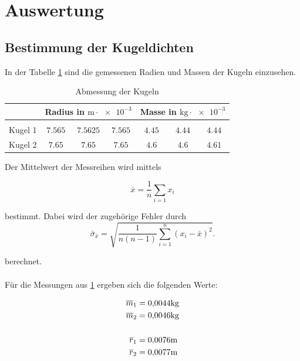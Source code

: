 \section{Auswertung}


\subsection{Bestimmung der Kugeldichten}

In der Tabelle \ref{tab:messwerte_kugel} sind die gemessenen
Radien und Massen der Kugeln einzusehen.

\begin{table}
\centering
\begin{tabular} {ccccccc}
	\toprule
  & \multicolumn{3}{c}{Radius in $\si{\meter}\cdot \num{e-3}$}  & \multicolumn{3}{c}{Masse in $\si{\kilogram}\cdot \num{e-3}$} \\
\midrule \\
Kugel 1 & $\num{7.565} $&  $\num{7.5625} $ & $\num{7.565} $  & $\num{4.45}$ & $\num{4.44} $ & $\num{4.44} $ \\
Kugel 2  & $\num{7.65} $&  $\num{7.65} $ & $\num{7.65} $ & $\num{4.6}$ & $\num{4.6} $ & $\num{4.61} $ \\
\bottomrule
\end{tabular}
\caption{Abmessung der Kugeln}
\label{tab:messwerte_kugel}
\end{table}

Der Mittelwert der Messreihen wird mittels

\begin{equation}
\label{eq:mittel}
\bar{x}=\frac{1}{n}\sum_{i=1}x_i
\end{equation}

bestimmt. Dabei wird der zugehörige Fehler
durch
\begin{equation}
\label{eq:stand_ab}
\bar{\sigma}_{\bar{x}}=\sqrt{\frac{1}{n(n-1)}\sum_{i=1}^{n}(x_i-\bar{x})^2}.
\end{equation}

berechnet.
\\ \hfill %
\\
\hfill
Für die Messungen aus \ref{tab:messwerte_kugel} ergeben sich die
folgenden Werte:

\begin{align}
\label{eq:abmessungen_kugel}
\begin{aligned}
\overline{m}_{1}&=  \num{0.0044}\si{\kilogram} \\
\overline{m}_{2}&= \num{0.0046} \si{\kilogram} \\
\hfill \\
\overline{r}_{1}&= \num{0.0076}\si{\meter} \\
\overline{r}_{2}&= \num{0.0077} \si{\meter} \\
\end{aligned}
\end{align}

